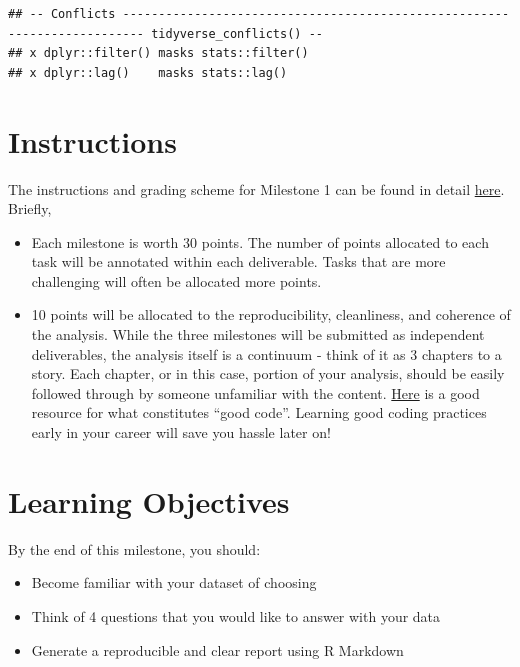 \documentclass[
]{article}
\providecommand{\tightlist}{%
  \setlength{\itemsep}{0pt}\setlength{\parskip}{0pt}}
\begin{document}
\begin{verbatim}
## -- Conflicts ------------------------------------------------------------------------- tidyverse_conflicts() --
## x dplyr::filter() masks stats::filter()
## x dplyr::lag()    masks stats::lag()
\end{verbatim}

\hypertarget{instructions}{%
\section{Instructions}\label{instructions}}

The instructions and grading scheme for Milestone 1 can be found in
detail \href{}{here}. Briefly,

\begin{itemize}
\item
  Each milestone is worth 30 points. The number of points allocated to
  each task will be annotated within each deliverable. Tasks that are
  more challenging will often be allocated more points.
\item
  10 points will be allocated to the reproducibility, cleanliness, and
  coherence of the analysis. While the three milestones will be
  submitted as independent deliverables, the analysis itself is a
  continuum - think of it as 3 chapters to a story. Each chapter, or in
  this case, portion of your analysis, should be easily followed through
  by someone unfamiliar with the content.
  \href{https://swcarpentry.github.io/r-novice-inflammation/06-best-practices-R/}{Here}
  is a good resource for what constitutes ``good code''. Learning good
  coding practices early in your career will save you hassle later on!
\end{itemize}

\hypertarget{learning-objectives}{%
\section{Learning Objectives}\label{learning-objectives}}

By the end of this milestone, you should:

\begin{itemize}
\tightlist
\item
  Become familiar with your dataset of choosing
\item
  Think of 4 questions that you would like to answer with your data
\item
  Generate a reproducible and clear report using R Markdown
\end{itemize}
\end{document}

